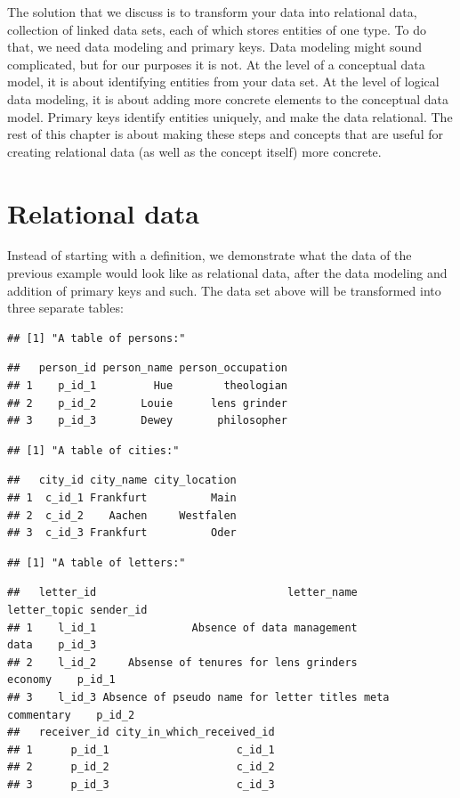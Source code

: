 \documentclass[
]{book}
\begin{document}
The solution that we discuss is to transform your data into relational data, collection of linked data sets, each of which stores entities of one type. To do that, we need data modeling and primary keys. Data modeling might sound complicated, but for our purposes it is not. At the level of a conceptual data model, it is about identifying entities from your data set. At the level of logical data modeling, it is about adding more concrete elements to the conceptual data model. Primary keys identify entities uniquely, and make the data relational. The rest of this chapter is about making these steps and concepts that are useful for creating relational data (as well as the concept itself) more concrete.

\hypertarget{relational-data}{%
\section{Relational data}\label{relational-data}}

Instead of starting with a definition, we demonstrate what the data of the previous example would look like as relational data, after the data modeling and addition of primary keys and such. The data set above will be transformed into three separate tables:

\begin{verbatim}
## [1] "A table of persons:"
\end{verbatim}

\begin{verbatim}
##   person_id person_name person_occupation
## 1    p_id_1         Hue        theologian
## 2    p_id_2       Louie      lens grinder
## 3    p_id_3       Dewey       philosopher
\end{verbatim}

\begin{verbatim}
## [1] "A table of cities:"
\end{verbatim}

\begin{verbatim}
##   city_id city_name city_location
## 1  c_id_1 Frankfurt          Main
## 2  c_id_2    Aachen     Westfalen
## 3  c_id_3 Frankfurt          Oder
\end{verbatim}

\begin{verbatim}
## [1] "A table of letters:"
\end{verbatim}

\begin{verbatim}
##   letter_id                              letter_name    letter_topic sender_id
## 1    l_id_1               Absence of data management            data    p_id_3
## 2    l_id_2     Absense of tenures for lens grinders         economy    p_id_1
## 3    l_id_3 Absence of pseudo name for letter titles meta commentary    p_id_2
##   receiver_id city_in_which_received_id
## 1      p_id_1                    c_id_1
## 2      p_id_2                    c_id_2
## 3      p_id_3                    c_id_3
\end{verbatim}
\end{document}
